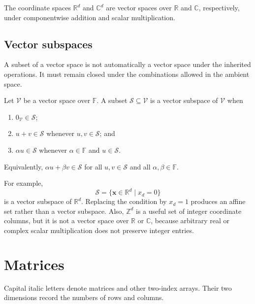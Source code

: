 The coordinate spaces \(\mathbb R^d\) and \(\mathbb C^d\) are vector spaces
over \(\mathbb R\) and \(\mathbb C\), respectively, under componentwise
addition and scalar multiplication.

\subsection{Vector subspaces}

A subset of a vector space is not automatically a vector space under the
inherited operations. It must remain closed under the combinations allowed in
the ambient space.

\begin{definition}
\label{def:training-vector-subspace}
Let \(\mathcal V\) be a vector space over \(\mathbb F\). A subset
\(\mathcal S\subseteq\mathcal V\) is a vector subspace of \(\mathcal V\)
when
\begin{enumerate}
  \item \(0_{\mathcal V}\in\mathcal S\);
  \item \(u+v\in\mathcal S\) whenever \(u,v\in\mathcal S\); and
  \item \(\alpha u\in\mathcal S\) whenever
        \(\alpha\in\mathbb F\) and \(u\in\mathcal S\).
\end{enumerate}
Equivalently, \(\alpha u+\beta v\in\mathcal S\) for all
\(u,v\in\mathcal S\) and all \(\alpha,\beta\in\mathbb F\).
\end{definition}

For example,
\begin{equation}
  \mathcal S=\{\mathbf x\in\mathbb R^d\mid x_d=0\}
\end{equation}
is a vector subspace of \(\mathbb R^d\). Replacing the condition by
\(x_d=1\) produces an affine set rather than a vector subspace. Also,
\(\mathbb Z^d\) is a useful set of integer coordinate columns, but it is
not a vector space over \(\mathbb R\) or \(\mathbb C\), because arbitrary real
or complex scalar multiplication does not preserve integer entries.

\section{Matrices}

Capital italic letters denote matrices and other two-index arrays. Their two
dimensions record the numbers of rows and columns.


